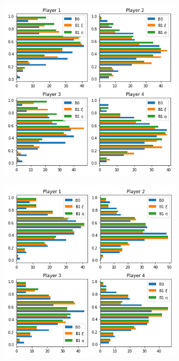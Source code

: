 \begin{figure}[!hb]
\begin{subfigure}{.3\textwidth}
    \label{fig:33}
	\end{subfigure}%
		\begin{subfigure}{.3\textwidth}
	    \centering
	    \includegraphics[width=1\linewidth]{Bilder/exp2_2.png}
	    \label{fig:34}
    \end{subfigure}%
	\begin{subfigure}{.3\textwidth}
    	\centering
    	\includegraphics[width=1\linewidth]{Bilder/exp3_2.png}
    	\label{fig:35}
	\end{subfigure}
\end{figure}


